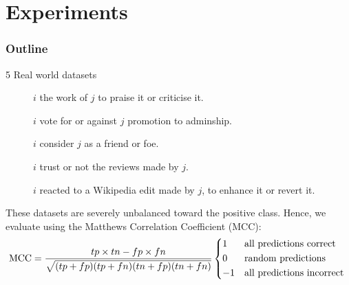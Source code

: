 \documentclass[10pt,svgnames,ignorenonframetext,final]{beamer}
\providecommand{\tightlist}{%
  \setlength{\itemsep}{0pt}\setlength{\parskip}{0pt}}
\begin{document}

\section{Experiments}\label{experiments}
  \begin{frame} \frametitle{Outline} \tableofcontents[currentsection] \end{frame}

\begin{frame}{5 Real world datasets}

\begin{description}
\item[\aut{}]
\(i\) the work of \(j\) to praise it or criticise it.

\item[\wik{}]
\(i\) vote for or against \(j\) promotion to adminship.

\item[\sla{}]
\(i\) consider \(j\) as a friend or foe.

\item[\epi{}]
\(i\) trust or not the reviews made by \(j\).

\item[\kiw{}]
\(i\) reacted to a Wikipedia edit made by \(j\), to enhance it or revert it.

\end{description}

These datasets are severely unbalanced toward the positive class.
Hence, we evaluate using the Matthews Correlation Coefficient (MCC):
\[\mathrm{MCC} = \frac{tp\times tn-fp\times fn} {\sqrt{ (tp + fp) ( tp + fn ) ( tn + fp ) ( tn + fn ) } }
 \begin{dcases*}
1 & all predictions correct \\
0 & random predictions \\
-1 & all predictions incorrect \\
\end{dcases*}
\]

\end{frame}


%


%
\end{document}
